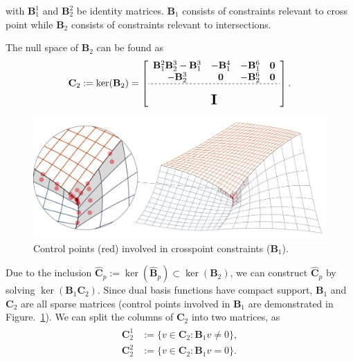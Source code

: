 \documentclass[preprint,12pt]{elsarticle}
\theoremstyle{remark}
\begin{document}
with $\mathbf{B}_1^1$ and $\mathbf{B}_2^2$ be identity matrices. $\mathbf{B}_1$ consists of constraints relevant to cross point while $\mathbf{B}_2$ consists of constraints relevant to intersections. \par
The null space of ${\mathbf{B}}_2$ can be found as
\begin{equation}
    \mathbf{C}_2:=\ker({\mathbf{B}}_2)=
    \left[\begin{array}{cccc}
      \mathbf{B}_1^2\mathbf{B}_2^3-\mathbf{B}_1^3 & -\mathbf{B}_1^4 & -\mathbf{B}_1^6 & \mathbf{0} \\ 
      -\mathbf{B}_2^3 & \mathbf{0} & -\mathbf{B}_2^6 & \mathbf{0} \\ \hdashline[2pt/2pt]
       \multicolumn{4}{c}{\multirow{3}{*}{\raisebox{0mm}{\scalebox{1.5}{$\mathbf{I}$}}}}\\
       & & & 
    \end{array}\right].
\end{equation}
\begin{figure}[hbt]
	\centering
    \includegraphics[width=\linewidth]{mesh_spy}
	\caption{Control points (red) involved in crosspoint constraints ($\mathbf{B}_1$).}\label{fig:cross_point_dof}
\end{figure}
Due to the inclusion $\hat{\mathbf{C}}_p:=\ker(\hat{\mathbf{B}}_p)\subset{\ker({\mathbf{B}}_2)}$, we can construct $\hat{\mathbf{C}}_p$ by solving $\ker(\mathbf{B}_1\mathbf{C}_2)$. Since dual basis functions have compact support, $\mathbf{B}_1$ and $\mathbf{C}_2$ are all sparse matrices (control points involved in $\mathbf{B}_1$ are demonstrated in Figure.~\ref{fig:cross_point_dof}). We can split the columns of $\mathbf{C}_2$ into two matrices, as
\begin{align}
    \begin{split}
        \mathbf{C}_2^1&:=\{v\in\mathbf{C}_2\colon{\mathbf{B}_1v\neq{0}}\},\\
        \mathbf{C}_2^2&:=\{v\in\mathbf{C}_2\colon{\mathbf{B}_1v={0}}\}.
    \end{split}
\end{align}
\end{document}
